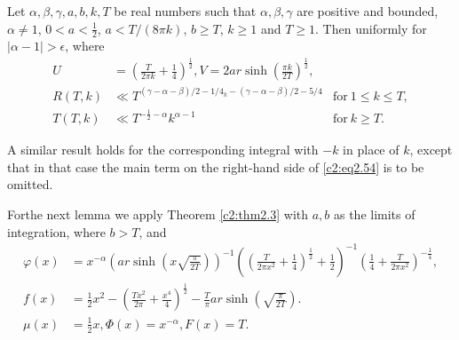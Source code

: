 \begin{lemma}\label{c2:lem2.2}
  Let $\alpha, \beta, \gamma, a, b, k, T$ be real numbers such that
  $\alpha, \beta, \gamma$ are positive and bounded, $\alpha \neq 1$,
  $0< a< \frac{1}{2}$, $a < T /(8 \pi k)$, $b \geq  T$, $k \geq 1$ and $T
  \geq 1$. Then
  {}
uniformly for $|\alpha - 1|> \epsilon$, where
\begin{align*}
  U & = \left(\frac{T}{2 \pi k} + \frac{1}{4} \right)^{\frac{1}{2}}, V
  = 2 ar \sinh \left(\frac{\pi k}{2T} \right)^{\frac{1}{2}},& \\
  R(T, k) & \ll  T^{(\gamma - \alpha - \beta)/2-1/4_k - (\gamma -
    \alpha - \beta)/2- 5/4} & \text{for}~ 1 \leq k \leq T,\\
  T(T, k) & \ll T^{- \frac{1}{2}- \alpha} k^{\alpha-1}& \text{for}~ k
  \geq T.
\end{align*}
\end{lemma}

A similar result holds for the corresponding integral with $-k$ in
place of $k$, except that in that case the main term on the right-hand
side of \eqref{c2:eq2.54} is to be omitted.

For\pageoriginale the next lemma we apply Theorem \ref{c2:thm2.3} with
$a, b$ as the limits of integration, where $b> T$, and
\begin{align*}
  \varphi(x) & = x^{- \alpha} \left(ar \sinh \left(x
  \sqrt{\frac{\pi}{2T}} \right) \right)^{-1} \left( \left( \frac{T}{2
    \pi x^2} + \frac{1}{4} \right)^{\frac{1}{2}} +
  \frac{1}{2}\right)^{-1} \left( \frac{1}{4} + \frac{T}{2 \pi
    x^2}\right)^{- \frac{1}{4}},\\
  f(x) & = \frac{1}{2} x^2 - \left(\frac{Tx^2}{2 \pi} + \frac{x^4}{4}
  \right)^{\frac{1}{2}} - \frac{T}{\pi} ar \sinh
  \left(\sqrt{\frac{\pi}{2 T}} \right).\\
  \mu(x) & = \frac{1}{2} x, \Phi (x) = x^{- \alpha}, F(x) = T.
\end{align*}

